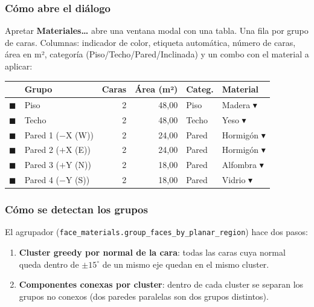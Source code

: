 \documentclass[11pt, a4paper]{article}
\newcommand{\menu}[1]{\textbf{\guillemotleft #1\guillemotright}}
\begin{document}
\subsubsection*{Cómo abre el diálogo}

Apretar \menu{Materiales\ldots} abre una ventana modal con
una tabla. Una fila por grupo de caras. Columnas: indicador de color,
etiqueta automática, número de caras, área en m², categoría
(Piso/Techo/Pared/Inclinada) y un combo con el material a aplicar:

\begin{center}
\begin{tabular}{p{0.4cm} l r r l l}
  \toprule
  & \textbf{Grupo} & \textbf{Caras} & \textbf{Área (m²)} & \textbf{Categ.} & \textbf{Material} \\
  \midrule
  \textcolor{green!60!black}{$\blacksquare$} & Piso              & 2 & 48,00 & Piso  & Madera \;$\blacktriangledown$ \\
  \textcolor{blue!60!black}{$\blacksquare$}  & Techo             & 2 & 48,00 & Techo & Yeso \;$\blacktriangledown$  \\
  \textcolor{orange!80!black}{$\blacksquare$}& Pared 1 ($-$X (W))  & 2 & 24,00 & Pared & Hormigón \;$\blacktriangledown$ \\
  \textcolor{orange!80!black}{$\blacksquare$}& Pared 2 ($+$X (E))  & 2 & 24,00 & Pared & Hormigón \;$\blacktriangledown$ \\
  \textcolor{orange!80!black}{$\blacksquare$}& Pared 3 ($+$Y (N))  & 2 & 18,00 & Pared & Alfombra \;$\blacktriangledown$ \\
  \textcolor{orange!80!black}{$\blacksquare$}& Pared 4 ($-$Y (S))  & 2 & 18,00 & Pared & Vidrio \;$\blacktriangledown$ \\
  \bottomrule
\end{tabular}
\end{center}

\subsubsection*{Cómo se detectan los grupos}

El agrupador (\texttt{face\_materials.group\_faces\_by\_planar\_region})
hace dos pasos:

\begin{enumerate}
  \item \textbf{Cluster greedy por normal de la cara}: todas las caras
        cuya normal queda dentro de $\pm 15^{\circ}$ de un mismo eje
        quedan en el mismo cluster.
  \item \textbf{Componentes conexas por cluster}: dentro de cada
        cluster se separan los grupos no conexos (dos paredes
        paralelas son dos grupos distintos).
\end{enumerate}
\end{document}
